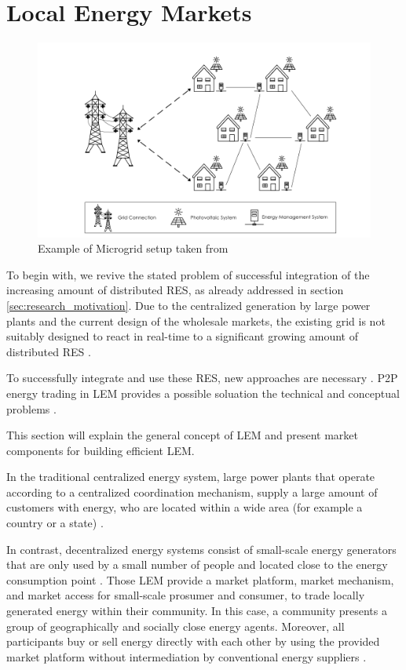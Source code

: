 \section{Local Energy Markets}
\label{sec:lem}

\begin{figure}[htbp]
	\centering
	\includegraphics[width=.9\linewidth]{./figures/microgrid_1024x.png}
	\caption{Example of Microgrid setup taken from \protect{}}
	\label{figure:microgrid}
\end{figure}

To begin with, we revive the stated problem of successful integration of the increasing amount of
distributed RES, as already addressed 
in section \ref{sec:research_motivation}. Due to the centralized generation by large power plants
and the current design of the wholesale markets, the existing grid is not suitably designed
to react in real-time to a significant growing 
amount of distributed RES  .

To successfully integrate and use these RES, new approaches are necessary .
P2P energy trading in LEM provides a possible soluation the technical and conceptual problems .

This section will explain the general concept of LEM
and present market components for building efficient LEM. 

In the traditional centralized energy system, large power plants that operate according to a
centralized coordination mechanism, supply a large amount of customers with energy, who are located 
within a wide area (for example a country or a state) .

In contrast, decentralized energy systems consist of small-scale energy generators that are 
only used by a small number of people and located close to the energy consumption point .
Those LEM provide a market platform, market mechanism, and market access
for small-scale prosumer and consumer, to trade locally generated energy within their community.
In this case, a community presents a group of geographically and socially close energy agents.
Moreover, all participants buy or sell energy directly with each other by using the provided market platform
without intermediation by conventional energy suppliers .

